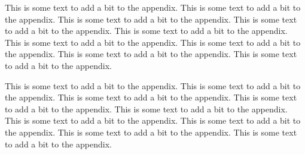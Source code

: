 

This is some text to add a bit to the appendix. 
This is some text to add a bit to the appendix. 
This is some text to add a bit to the appendix. 
This is some text to add a bit to the appendix. 
This is some text to add a bit to the appendix. 
This is some text to add a bit to the appendix. 
This is some text to add a bit to the appendix. 
This is some text to add a bit to the appendix. 
This is some text to add a bit to the appendix. 

This is some text to add a bit to the appendix. 
This is some text to add a bit to the appendix. 
This is some text to add a bit to the appendix. 
This is some text to add a bit to the appendix. 
This is some text to add a bit to the appendix. 
This is some text to add a bit to the appendix. 
This is some text to add a bit to the appendix. 
This is some text to add a bit to the appendix. 
This is some text to add a bit to the appendix. 

